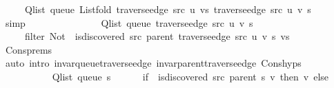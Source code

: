 \begin{isabellebody}
\ \ \ \ \ Q{\isacharunderscore}{\kern0pt}list\ {\isacharparenleft}{\kern0pt}queue\ {\isacharparenleft}{\kern0pt}List{\isachardot}{\kern0pt}fold\ {\isacharparenleft}{\kern0pt}traverse{\isacharunderscore}{\kern0pt}edge\ src\ u{\isacharparenright}{\kern0pt}\ vs\ {\isacharparenleft}{\kern0pt}traverse{\isacharunderscore}{\kern0pt}edge\ src\ u\ v\ s{\isacharparenright}{\kern0pt}{\isacharparenright}{\kern0pt}{\isacharparenright}{\kern0pt}{\isachardoublequoteclose}\isanewline
\ \ \ \ \isamarkupfalse%
\ simp\isanewline
\ \ \isamarkupfalse%
\ \isamarkupfalse%
\isanewline
\ \ \ \ {\isachardoublequoteopen}{\isachardot}{\kern0pt}{\isachardot}{\kern0pt}{\isachardot}{\kern0pt}\ {\isacharequal}{\kern0pt}\isanewline
\ \ \ \ \ Q{\isacharunderscore}{\kern0pt}list\ {\isacharparenleft}{\kern0pt}queue\ {\isacharparenleft}{\kern0pt}traverse{\isacharunderscore}{\kern0pt}edge\ src\ u\ v\ s{\isacharparenright}{\kern0pt}{\isacharparenright}{\kern0pt}\ {\isacharat}{\kern0pt}\isanewline
\ \ \ \ \ filter\ {\isacharparenleft}{\kern0pt}Not\ {\isasymcirc}\ is{\isacharunderscore}{\kern0pt}discovered\ src\ {\isacharparenleft}{\kern0pt}parent\ {\isacharparenleft}{\kern0pt}traverse{\isacharunderscore}{\kern0pt}edge\ src\ u\ v\ s{\isacharparenright}{\kern0pt}{\isacharparenright}{\kern0pt}{\isacharparenright}{\kern0pt}\ vs{\isachardoublequoteclose}\isanewline
\ \ \ \ \isamarkupfalse%
\ Cons{\isachardot}{\kern0pt}prems\isanewline
\ \ \ \ \isamarkupfalse%
\ {\isacharparenleft}{\kern0pt}auto\ intro{\isacharcolon}{\kern0pt}\ invar{\isacharunderscore}{\kern0pt}queue{\isacharunderscore}{\kern0pt}traverse{\isacharunderscore}{\kern0pt}edge\ invar{\isacharunderscore}{\kern0pt}parent{\isacharunderscore}{\kern0pt}traverse{\isacharunderscore}{\kern0pt}edge\ Cons{\isachardot}{\kern0pt}hyps{\isacharparenright}{\kern0pt}\isanewline
\ \ \isamarkupfalse%
\ \isamarkupfalse%
\isanewline
\ \ \ \ {\isachardoublequoteopen}{\isachardot}{\kern0pt}{\isachardot}{\kern0pt}{\isachardot}{\kern0pt}\ {\isacharequal}{\kern0pt}\isanewline
\ \ \ \ \ Q{\isacharunderscore}{\kern0pt}list\ {\isacharparenleft}{\kern0pt}queue\ s{\isacharparenright}{\kern0pt}\ {\isacharat}{\kern0pt}\isanewline
\ \ \ \ \ {\isacharparenleft}{\kern0pt}if\ {\isasymnot}\ is{\isacharunderscore}{\kern0pt}discovered\ src\ {\isacharparenleft}{\kern0pt}parent\ s{\isacharparenright}{\kern0pt}\ v\ then\ {\isacharbrackleft}{\kern0pt}v{\isacharbrackright}{\kern0pt}\ else\ {\isacharbrackleft}{\kern0pt}{\isacharbrackright}{\kern0pt}{\isacharparenright}{\kern0pt}\ {\isacharat}{\kern0pt}\isanewline

\end{isabellebody}
